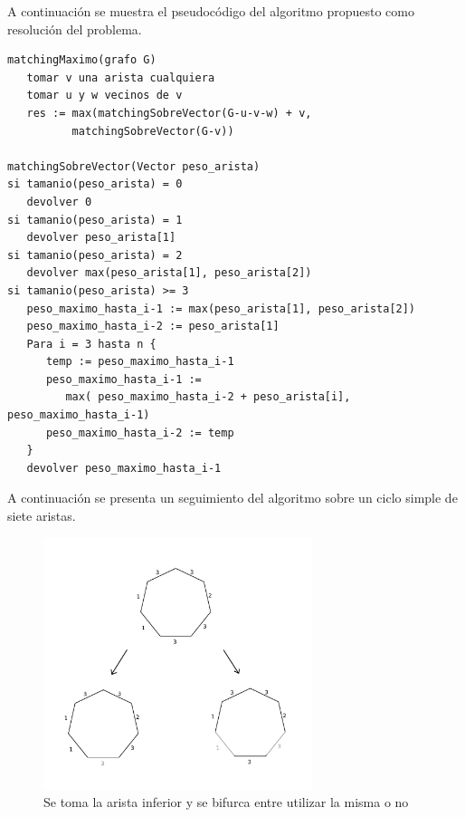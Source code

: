 \documentclass[a4paper, 12pt]{article}
\begin{document}
A continuación se muestra el pseudocódigo del algoritmo propuesto como resolución del problema.


\begin{verbatim}
matchingMaximo(grafo G)
   tomar v una arista cualquiera
   tomar u y w vecinos de v
   res := max(matchingSobreVector(G-u-v-w) + v, 
          matchingSobreVector(G-v))

matchingSobreVector(Vector peso_arista)
si tamanio(peso_arista) = 0
   devolver 0
si tamanio(peso_arista) = 1
   devolver peso_arista[1]
si tamanio(peso_arista) = 2
   devolver max(peso_arista[1], peso_arista[2])
si tamanio(peso_arista) >= 3
   peso_maximo_hasta_i-1 := max(peso_arista[1], peso_arista[2]) 
   peso_maximo_hasta_i-2 := peso_arista[1]
   Para i = 3 hasta n {
      temp := peso_maximo_hasta_i-1
      peso_maximo_hasta_i-1 := 
         max( peso_maximo_hasta_i-2 + peso_arista[i], peso_maximo_hasta_i-1)
      peso_maximo_hasta_i-2 := temp
   }
   devolver peso_maximo_hasta_i-1

\end{verbatim}

A continuación se presenta un seguimiento del algoritmo sobre un ciclo simple de siete aristas.

\begin{figure}[H]
\begin{center}
\includegraphics[width=0.7\textwidth]{imagenes/paso1y2.png}
\caption{Se toma la arista inferior y se bifurca entre utilizar la misma o no}
\end{center}
\end{figure}
\end{document}
